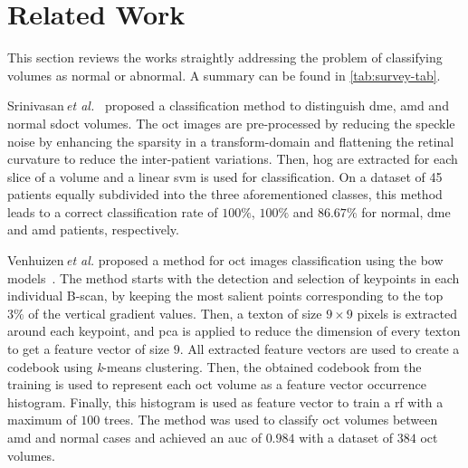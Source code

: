 
\section{Related Work}\label{sec:rw}
This section reviews the works straightly addressing the problem of classifying \oct volumes as normal or abnormal. A summary can be found in \ref{tab:survey-tab}.

Srinivasan\,\textit{et al.}~\cite{Srinivasan2014} proposed a classification method to distinguish \ac{dme}, \ac{amd} and normal \ac{sdoct} volumes.
The \ac{oct} images are pre-processed by reducing the speckle noise by enhancing the sparsity in a transform-domain and flattening the retinal curvature to reduce the inter-patient variations.
Then, \ac{hog} are extracted for each slice of a volume and a linear \ac{svm} is used for classification.
On a dataset of 45 patients equally subdivided into the three aforementioned classes, this method leads to a correct classification rate of $100 \%$, $100 \%$ and $86.67 \%$ for normal, \ac{dme} and \ac{amd} patients, respectively.

Venhuizen\,\textit{et al.} proposed a method for \ac{oct} images classification using the \ac{bow} models~\cite{Venhuizen2015}.
The method starts with the detection and selection of keypoints in each individual B-scan, by keeping the most salient points corresponding to the top $3 \%$ of the vertical gradient values. Then, a texton of size $9 \times 9$ pixels is extracted around each keypoint, and \ac{pca} is applied to reduce the dimension of every texton to get a feature vector of size $9$.
All extracted feature vectors are used to create a codebook using \textit{k}-means clustering.
Then, the obtained codebook from the training is used to represent each \ac{oct} volume as a feature {\color{red}vector occurrence histogram}.
Finally, this histogram is used as feature vector to train a \ac{rf} with a maximum of $100$ trees.
The method was used to classify \ac{oct} volumes between \ac{amd} and normal cases and achieved an \ac{auc} of $0.984$ with a dataset of $384$ \ac{oct} volumes.

